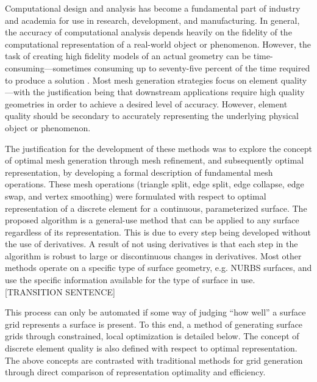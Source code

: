 Computational design and analysis has become a fundamental part of
industry and academia for use in research, development, and
manufacturing. In general, the accuracy of computational analysis
depends heavily on the fidelity of the computational representation of a
real-world object or phenomenon. However, the task of creating high
fidelity models of an actual geometry can be time-consuming---sometimes
consuming up to seventy-five percent of the time required to produce a
solution \cite{bischoff05}. Most mesh generation strategies focus on
element quality---with the justification being that downstream
applications require high quality geometries in order to achieve a
desired level of accuracy. However, element quality should be secondary
to accurately representing the underlying physical object or phenomenon.

The justification for the development of these methods was to explore
the concept of optimal mesh generation through mesh refinement, and
subsequently optimal representation, by developing a formal description
of fundamental mesh operations. These mesh operations (triangle split,
edge split, edge collapse, edge swap, and vertex smoothing) were
formulated with respect to optimal representation of a discrete element
for a continuous, parameterized surface. The proposed algorithm is a
general-use method that can be applied to any surface regardless of its
representation. This is due to every step being developed without the
use of derivatives. A result of not using derivatives is that each step
in the algorithm is robust to large or discontinuous changes in
derivatives. Most other methods operate on a specific type of surface
geometry, e.g. NURBS surfaces, and use the specific information
available for the type of surface in use.
[TRANSITION SENTENCE] 

This process can only be automated if some way of judging ``how well'' a
surface grid represents a surface is present. To this end, a method of
generating surface grids through constrained, local optimization is
detailed below. The concept of discrete element quality is also defined
with respect to optimal representation. The above concepts are
contrasted with traditional methods for grid generation through direct
comparison of representation optimality and efficiency.
